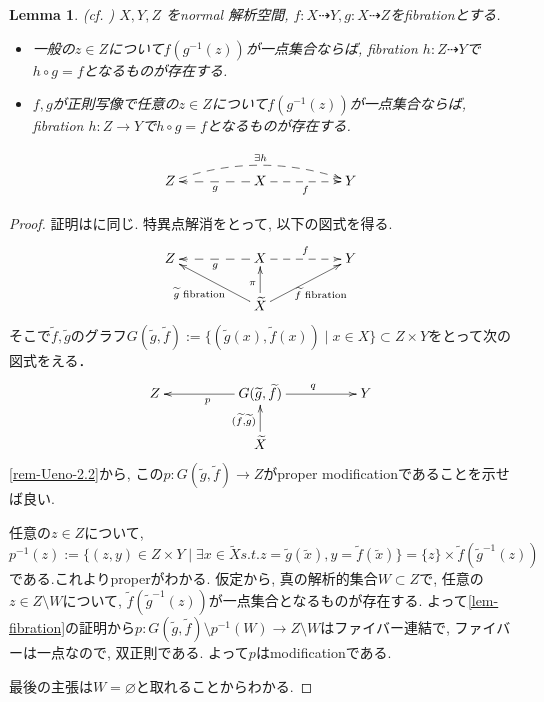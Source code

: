 \documentclass[dvipdfmx,a4paper,11pt]{article} %
\newtheorem{lem}[thm]{Lemma}
\theoremstyle{definition}
\theoremstyle{remark}
\numberwithin{equation}{section}
\begin{document}
\begin{lem}(cf. \cite[Lemma 1.15]{Deb01})
\label{lem-rigidity}
\(X, Y, Z\) をnormal 解析空間, 
 $f : X \dashrightarrow Y, g : X \dashrightarrow Z$をfibrationとする. 

\begin{itemize}
\item 一般の$z \in Z$について$f(g^{-1}(z))$が一点集合ならば, fibration $h : Z \dashrightarrow Y$で$h\circ g=f$となるものが存在する. 
\item $f, g$が正則写像で任意の$z \in Z$について$f(g^{-1}(z))$が一点集合ならば, fibration $h : Z \to Y$で$h\circ g=f$となるものが存在する. 
\end{itemize}

   \[
\xymatrix@C=50pt@R=20pt{
Z \ar@/^1pc/@{-->}[rr]^{\exists h}& X  \ar@{-->}[l]^{g}\ar@{-->}[r]_{f} &Y\\
}
\]
\end{lem}
\begin{proof}
証明は\cite[Lemma 1.15]{Deb01}に同じ. 
特異点解消をとって, 以下の図式を得る. 
  \[
\xymatrix@C=50pt@R=20pt{
Z & X  \ar@{-->}[l]^{g}\ar@{-->}[r]^{f} &Y\\
 & \widetilde{X}  \ar@{->}[lu]^{\widetilde{g} \text{ fibration}}\ar@{->}[ru]_{\widetilde{f}  \text{ fibration }} \ar@{->}[u]^{\pi } &\\
}
\]
そこで$\widetilde{f}, \widetilde{g}$のグラフ$G(\widetilde{g}, \widetilde{f}):= \{ (\widetilde{g}(x), \widetilde{f}(x)) \mid x \in X\} \subset Z \times Y$をとって次の図式をえる． 
  \[
\xymatrix@C=50pt@R=20pt{
Z & G( \widetilde{g}, \widetilde{f})  \ar@{->}[l]^{p}\ar@{->}[r]^{q} &Y\\
 & \widetilde{X}  \ar@{->}[u]^{(\widetilde{f}, \widetilde{g}) } &\\
}
\]
\ref{rem-Ueno-2.2}から, この$p : G(\widetilde{g}, \widetilde{f}) \to Z$がproper modificationであることを示せば良い. 

任意の$z \in Z$について, 
$$
p^{-1}(z):= \{ (z, y) \in Z \times Y \mid \exists x \in  \widetilde{X} s.t. z =\widetilde{g}(\widetilde{x}), y =\widetilde{f}(\widetilde{x})\}=\{ z \} \times \widetilde{f}(\widetilde{g}^{-1}(z))
$$
である.これよりproperがわかる. 
仮定から, 真の解析的集合$W \subset Z$で, 任意の$z \in Z \setminus W$について, $\widetilde{f}(\widetilde{g}^{-1}(z))$が一点集合となるものが存在する. 
よって\ref{lem-fibration}の証明から$p : G(\widetilde{g}, \widetilde{f}) \setminus p^{-1}(W) \to Z \setminus W$はファイバー連結で, ファイバーは一点なので, 双正則である. よって$p$はmodificationである. 

最後の主張は$W = \varnothing$と取れることからわかる. 
\end{proof}
\end{document}
